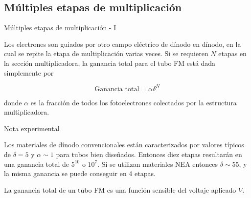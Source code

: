 \documentclass[a4paper,10pt]{beamer}
\begin{document}
\subsection{Múltiples etapas de multiplicación}
\begin{frame}{Múltiples etapas de multiplicación - I}
 \begin{justify}
 Los electrones son guiados por otro campo eléctrico de dínodo en dínodo, en
 la cual se repite la etapa  de multiplicación varias veces. Si se requieren 
 $N$ etapas en la sección multiplicadora, la ganancia total para el tubo FM
 está dada simplemente por 
 
 \begin{equation}
  \text{Ganancia total} = \alpha \delta^N
 \end{equation}
 
 donde $\alpha$ es la fracción de todos los fotoelectrones colectados por la 
 estructura multiplicadora.
\end{justify}
 
 \begin{exampleblock}{Nota experimental}
 \begin{itemize}
 \begin{footnotesize}
\item \begin{justify}
  Los materiales de dínodo convencionales están caracterizados por valores típicos 
  de $\delta=5$ y $\alpha \sim 1$ para tubos bien diseñados. Entonces diez etapas
  resultarán en una ganancia total de $5^{10}$ o $10^7$. Si se utilizan materiales 
  NEA entonces $\delta \sim 55$, y la misma ganancia se puede conseguir en 4 etapas.
 \end{justify}
\item \begin{justify}
       La ganancia total de un tubo FM es una función sensible del voltaje aplicado $V$.
      \end{justify}
 \end{footnotesize}
 \end{itemize} 
 \end{exampleblock}

 
\end{frame}
\end{document}
